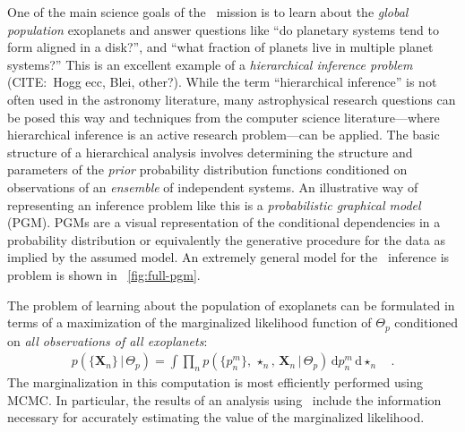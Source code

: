 \documentclass[letterpaper,12pt,preprint]{hack_aastex}
\newcommand{\Bart}{\package{Bart}}
\newcommand{\dd}{\,\mathrm{d}}
\begin{document}
One of the main science goals of the \Kepler\ mission is to learn about the
\emph{global population} exoplanets and answer questions like ``do planetary
systems tend to form aligned in a disk?'', and ``what fraction of planets live
in multiple planet systems?''
This is an excellent example of a \emph{hierarchical inference problem}
 (CITE:\ Hogg ecc, Blei, other?).
While the term ``hierarchical inference'' is not often used in the astronomy
literature, many astrophysical research questions can be posed this way and
techniques from the computer science literature---where hierarchical inference
is an active research problem---can be applied.
The basic structure of a hierarchical analysis involves determining the
structure and parameters of the \emph{prior} probability distribution
functions conditioned on observations of an \emph{ensemble} of independent
systems.
An illustrative way of representing an inference problem like this is a
\emph{probabilistic graphical model} (PGM).
PGMs are a visual representation of the conditional dependencies in a
probability distribution or equivalently the generative procedure for the data
as implied by the assumed model.
An extremely general model for the \Kepler\ inference is problem is shown in
\figurename~\ref{fig:full-pgm}.

The problem of learning about the population of exoplanets can be formulated
in terms of a maximization of the marginalized likelihood function of
$\Theta_p$ conditioned on \emph{all observations of all exoplanets}:
\begin{eqnarray}
p(\{\mathbf{X}_n\}\,|\,\Theta_p) = \int \prod_{n}
p(\{p_n^m\},\,\star_n,\,\mathbf{X}_n\,|\,\Theta_p)
\dd p_n^m \dd \star_n\quad.
\end{eqnarray}
The marginalization in this computation is most efficiently performed using
MCMC.
In particular, the results of an analysis using \Bart\ include the information
necessary for accurately estimating the value of the marginalized likelihood.
\end{document}
